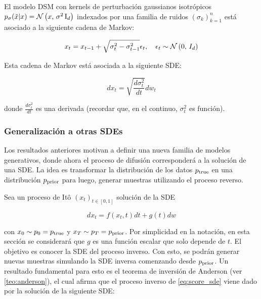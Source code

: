 \begin{prop}
    El modelo DSM con kernels de perturbación gaussianos isotrópicos $p_{\sigma}(\tilde x|x)=\mathcal{N}\left(x,\,\sigma^2\operatorname{I}_{d}\right)$ indexados por una familia de ruidos $(\sigma_k)_{k=1}^n$ está asociado a la siguiente cadena de Markov:

    \begin{equation}
        x_t = x_{t-1} + \sqrt{\sigma_t^2-\sigma^2_{t-1}} \epsilon_t,\quad \epsilon_t\sim\mathcal{N}\left(0,\,I_d\right)
    \end{equation}

    Esta cadena de Markov está asociada a la siguiente SDE:

    \begin{equation}
        \label{eq:sdm_sde}
        dx_t = \sqrt{\frac{d\sigma_t^2}{dt}}dw_t
    \end{equation}

    donde $\frac{d\sigma_t^2}{dt}$ es una derivada (recordar que, en el continuo, $\sigma_t^2$ es función).
\end{prop}

\subsubsection{Generalización a otras SDEs}

Los resultados anteriores motivan a definir una nueva familia de modelos generativos, donde ahora el proceso de difusión corresponderá a la solución de una SDE. La idea es transformar la distribución de los datos $p_{\operatorname{true}}$ en una distribución $p_{\operatorname{prior}}$ para luego, generar muestras utilizando el proceso reverso.

Sea un proceso de Itô $(x_t)_{t\in[0,1]}$ solución de la SDE

\begin{equation}
    \label{eq:score_sde}
    dx_t = f(x_t,t)dt+g(t) dw
\end{equation}

con $x_0 \sim p_0=p_{\operatorname{true}}$ y $x_T\sim p_T=p_{\operatorname{prior}}$. Por simplicidad en la notación, en esta sección se considerará que $g$ es una función escalar que solo depende de $t$. El objetivo es conocer la SDE del proceso inverso. Con esto, se podrán generar nuevas muestras simulando la SDE inversa comenzando desde $p_{\operatorname{prior}}$. Un resultado fundamental para esto es el teorema de inversión de Anderson (ver \autoref{teo:anderson}), el cual afirma que el proceso inverso de \eqref{eq:score_sde} viene dado por la solución de la siguiente SDE:

